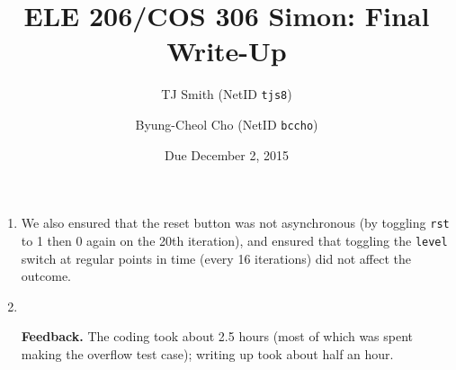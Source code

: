 \documentclass[12pt]{article}
\title{ELE 206/COS 306 Simon: Final Write-Up}
\author{TJ Smith (NetID \texttt{tjs8})\and Byung-Cheol Cho (NetID \texttt{bccho})}
\date{Due December 2, 2015}
\begin{document}
\maketitle

\begin{enumerate}[label=\textbf{Question \arabic*.}]
%
\item 

We also ensured that the reset button was not asynchronous (by toggling \texttt{rst} to 1 then 0 again on the 20th iteration), and ensured that toggling the \texttt{level} switch at regular points in time (every 16 iterations) did not affect the outcome. %
%
\item 
%
\item[\textbf{Feedback.}] The coding took about 2.5 hours (most of which was spent making the overflow test case); writing up took about half an hour.
%
\end{enumerate}
\end{document}
